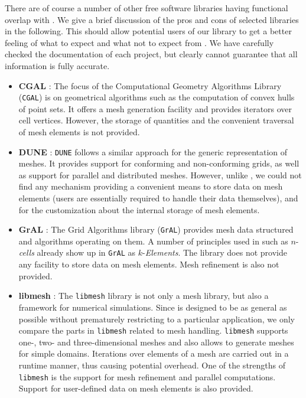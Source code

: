 There are of course a number of other free software libraries having functional overlap with {\ViennaGrid}. We give a brief discussion of the pros and cons of selected libraries in the following. This should allow potential users of our library to get a better feeling of what to expect and what not to expect from {\ViennaGrid}. We have carefully checked the documentation of each project, but clearly cannot guarantee that all information is fully accurate.
\begin{itemize}
  \item \textbf{CGAL} \cite{CGAL}: The focus of the Computational Geometry Algorithms Library (\texttt{CGAL}) is on geometrical algorithms such as the computation of convex hulls of point sets. It offers a mesh generation facility and provides iterators over cell vertices. However, the storage of quantities and the convenient traversal of mesh elements is not provided.

  \item \textbf{DUNE} \cite{DUNE}: \texttt{DUNE} follows a similar approach for the generic representation of meshes. It provides support for conforming and non-conforming grids, as well as support for parallel and distributed meshes. However, unlike {\ViennaGrid}, we could not find any mechanism providing a convenient means to store data on mesh elements (users are essentially required to handle their data themselves), and for the customization about the internal storage of mesh elements.

  \item \textbf{GrAL} \cite{GrAL}: The Grid Algorithms library (\texttt{GrAL}) provides mesh data structured and algorithms operating on them. A number of principles used in {\ViennaGrid} such as $n$-\textit{cells} already show up in \texttt{GrAL} as $k$-\textit{Elements}. The library does not provide any facility to store data on mesh elements. Mesh refinement is also not provided.

  \item \textbf{libmesh} \cite{libmesh}: The \texttt{libmesh} library is not only a mesh library, but also a framework for numerical simulations. Since {\ViennaGrid} is designed to be as general as possible without prematurely restricting to a particular application, we only compare the parts in \texttt{libmesh} related to mesh handling. \texttt{libmesh} supports one-, two- and three-dimensional meshes and also allows to generate meshes for simple domains. Iterations over elements of a mesh are carried out in a runtime manner, thus causing potential overhead. One of the strengths of \texttt{libmesh} is the support for mesh refinement and parallel computations. Support for user-defined data on mesh elements is also provided.


\end{itemize}
